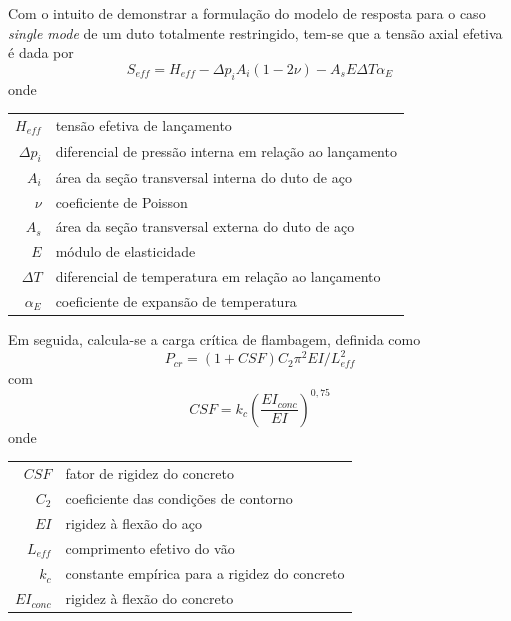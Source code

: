 Com o intuito de demonstrar a formulação do modelo de resposta para o caso \textit{single mode} de um duto totalmente restringido, tem-se que a tensão axial efetiva é dada por
\begin{equation}
\label{eq:viv-Seff}
S_\mathit{eff} = H_\mathit{eff} - \Delta p_i A_i (1 - 2\nu) - A_s E \Delta T \alpha_E
\end{equation}
onde

\begin{tabular}{rl}
$H_\mathit{eff}$ & tensão efetiva de lançamento\\
$\Delta p_i$     & diferencial de pressão interna em relação ao lançamento\\
$A_i$            & área da seção transversal interna do duto de aço\\
$\nu$            & coeficiente de Poisson\\
$A_s$            & área da seção transversal externa do duto de aço\\
$E$              & módulo de elasticidade\\
$\Delta T$       & diferencial de temperatura em relação ao lançamento\\
$\alpha_E$       & coeficiente de expansão de temperatura
\end{tabular}

Em seguida, calcula-se a carga crítica de flambagem, definida como
\begin{equation}
\label{eq:viv-Pcr}
P_\mathit{cr} = (1 + \mathit{CSF}) C_2\pi^2 \mathit{EI}/L_\mathit{eff}^2
\end{equation}
com
\begin{equation}
\label{eq:viv-CSF}
\mathit{CSF} = k_c {\left(\frac{\mathit{EI}_\mathit{conc}}{\mathit{EI}}\right)}^{0,75}
\end{equation}
onde

\begin{tabular}{rl}
	$\mathit{CSF}$               & fator de rigidez do concreto\\
	$C_2$                        & coeficiente das condições de contorno\\
	$\mathit{EI}$                & rigidez à flexão do aço\\
	$L_\mathit{eff}$             & comprimento efetivo do vão\\
	$k_c$                        & constante empírica para a rigidez do concreto\\
	$\mathit{EI}_\mathit{conc}$  & rigidez à flexão do concreto
\end{tabular}

